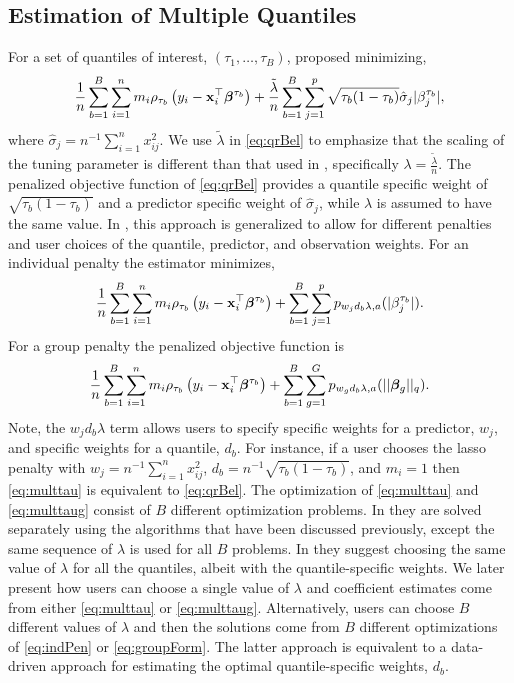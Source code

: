 \subsection{Estimation of Multiple Quantiles}\label{estimation-of-multiple-quantiles}

For a set of quantiles of interest, \((\tau_1,\ldots,\tau_B)\), \citet{qr_lasso} proposed minimizing,
\begin{equation}
\frac{1}{n} \sum_{b=1}^B\sum_{i=1}^n m_i \rho_{\tau_b}\left(y_i - {\bf x}_i^\top\bm \beta^{\tau_b}\right) + \frac{\tilde{\lambda}}{n} \sum_{b=1}^B\sum_{j=1}^p \sqrt{\tau_b(1-\tau_b)} \hat{\sigma}_j |\beta^{\tau_b}_j|,
\label{eq:qrBel}
\end{equation}
where \(\hat{\sigma}_j = n^{-1}\sum_{i=1}^n x_{ij}^2\). We use \(\tilde{\lambda}\) in \eqref{eq:qrBel} to emphasize that the scaling of the tuning parameter is different than that used in , specifically \(\lambda=\frac{\tilde{\lambda}}{n}\). The penalized objective function of \eqref{eq:qrBel} provides a quantile specific weight of \(\sqrt{\tau_b(1-\tau_b)}\) and a predictor specific weight of \(\hat{\sigma}_j\), while \(\lambda\) is assumed to have the same value. In , this approach is generalized to allow for different penalties and user choices of the quantile, predictor, and observation weights. For an individual penalty the estimator minimizes,
\begin{equation}
\frac{1}{n} \sum_{b=1}^B\sum_{i=1}^n m_i \rho_{\tau_b}\left(y_i - {\bf x}_i^\top\bm \beta^{\tau_b}\right) + \sum_{b=1}^B\sum_{j=1}^p p_{w_jd_b\lambda,a}(|\beta^{\tau_b}_j|).
\label{eq:multtau}
\end{equation}
For a group penalty the penalized objective function is
\begin{equation}
\frac{1}{n} \sum_{b=1}^B \sum_{i=1}^n m_i \rho_{\tau_b}\left(y_i - {\bf x}_i^\top\bm \beta^{\tau_b}\right) + \sum_{b=1}^B \sum_{g=1}^G p_{w_gd_b\lambda,a}(||\bm \beta_g||_q).
\label{eq:multtaug}
\end{equation}
Note, the \(w_jd_b\lambda\) term allows users to specify specific weights for a predictor, \(w_j\), and specific weights for a quantile, \(d_b\). For instance, if a user chooses the lasso penalty with \(w_j=n^{-1}\sum_{i=1}^nx_{ij}^2\), \(d_b=n^{-1}\sqrt{\tau_b(1-\tau_b)}\), and \(m_i=1\) then \eqref{eq:multtau} is equivalent to \eqref{eq:qrBel}. The optimization of \eqref{eq:multtau} and \eqref{eq:multtaug} consist of \(B\) different optimization problems. In  they are solved separately using the algorithms that have been discussed previously, except the same sequence of \(\lambda\) is used for all \(B\) problems. In \citet{qr_lasso} they suggest choosing the same value of \(\lambda\) for all the quantiles, albeit with the quantile-specific weights. We later present how users can choose a single value of \(\lambda\) and coefficient estimates come from either \eqref{eq:multtau} or \eqref{eq:multtaug}. Alternatively, users can choose \(B\) different values of \(\lambda\) and then the solutions come from \(B\) different optimizations of \eqref{eq:indPen} or \eqref{eq:groupForm}. The latter approach is equivalent to a data-driven approach for estimating the optimal quantile-specific weights, \(d_b\).

